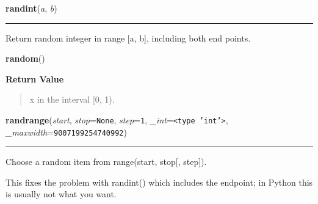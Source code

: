     \label{random:randint}

    \vspace{0.5ex}

\hspace{.8\funcindent}\begin{boxedminipage}{\funcwidth}

    \raggedright \textbf{randint}(\textit{a}, \textit{b})

    \vspace{-1.5ex}

    \rule{\textwidth}{0.5\fboxrule}
\setlength{\parskip}{2ex}
    Return random integer in range [a, b], including both end points.

\setlength{\parskip}{1ex}
    \end{boxedminipage}

    \label{random:random}

    \vspace{0.5ex}

\hspace{.8\funcindent}\begin{boxedminipage}{\funcwidth}

    \raggedright \textbf{random}()

\setlength{\parskip}{2ex}
\setlength{\parskip}{1ex}
      \textbf{Return Value}
    \vspace{-1ex}

      \begin{quote}
      x in the interval [0, 1).

      \end{quote}

    \end{boxedminipage}

    \label{random:randrange}

    \vspace{0.5ex}

\hspace{.8\funcindent}\begin{boxedminipage}{\funcwidth}

    \raggedright \textbf{randrange}(\textit{start}, \textit{stop}={\tt None}, \textit{step}={\tt 1}, \textit{\_int}={\tt {\textless}type 'int'{\textgreater}}, \textit{\_maxwidth}={\tt 9007199254740992})

    \vspace{-1.5ex}

    \rule{\textwidth}{0.5\fboxrule}
\setlength{\parskip}{2ex}
    Choose a random item from range(start, stop[, step]).

    This fixes the problem with randint() which includes the endpoint; in 
    Python this is usually not what you want.

\setlength{\parskip}{1ex}
    \end{boxedminipage}

